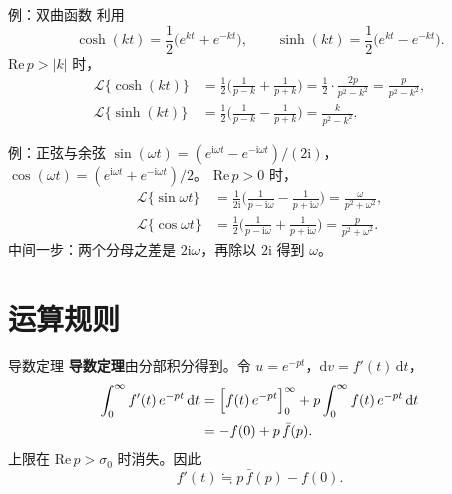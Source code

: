 \documentclass[fontset=windows, chinese, 10pt, xcolor=dvipsnames]{beamer}
\begin{document}
\begin{frame}{例：双曲函数}
  利用
  \begin{equation*}
    \cosh(kt)=\frac12\bigl(e^{kt}+e^{-kt}\bigr),
    \qquad
    \sinh(kt)=\frac12\bigl(e^{kt}-e^{-kt}\bigr).
  \end{equation*}
  $\mathrm{Re}\,p>|k|$ 时，
  \begin{align*}
    \mathcal{L}\{\cosh(kt)\}
    &=\frac12\Biggl(\frac{1}{p-k}+\frac{1}{p+k}\Biggr)
     =\frac12\cdot\frac{2p}{p^2-k^2}
     =\frac{p}{p^2-k^2},\\[0.4em]
    \mathcal{L}\{\sinh(kt)\}
    &=\frac12\Biggl(\frac{1}{p-k}-\frac{1}{p+k}\Biggr)
     =\frac{k}{p^2-k^2}.
  \end{align*}
\end{frame}

\begin{frame}{例：正弦与余弦}
  $\sin(\omega t)=(e^{\mathrm{i}\omega t}-e^{-\mathrm{i}\omega t})/(2\mathrm{i})$，
  $\cos(\omega t)=(e^{\mathrm{i}\omega t}+e^{-\mathrm{i}\omega t})/2$。
  $\mathrm{Re}\,p>0$ 时，
  \begin{align*}
    \mathcal{L}\{\sin\omega t\}
    &=\frac{1}{2\mathrm{i}}
      \Biggl(\frac{1}{p-\mathrm{i}\omega}-\frac{1}{p+\mathrm{i}\omega}\Biggr)
     =\frac{\omega}{p^2+\omega^2},\\[0.4em]
    \mathcal{L}\{\cos\omega t\}
    &=\frac12
      \Biggl(\frac{1}{p-\mathrm{i}\omega}+\frac{1}{p+\mathrm{i}\omega}\Biggr)
     =\frac{p}{p^2+\omega^2}.
  \end{align*}
  中间一步：两个分母之差是 $2\mathrm{i}\omega$，再除以 $2\mathrm{i}$ 得到 $\omega$。
\end{frame}

\section{运算规则}

\begin{frame}{导数定理}
  \textbf{导数定理}由分部积分得到。令 $u=e^{-pt}$，$\mathrm{d}v=f'(t)\,\mathrm{d}t$，
  \begin{align*}
    \int_0^{\infty} f'(t)\,e^{-pt}\,\mathrm{d}t
    &=\Bigl[f(t)\,e^{-pt}\Bigr]_0^{\infty}
      +p\int_0^{\infty} f(t)\,e^{-pt}\,\mathrm{d}t \\
    &=-f(0)+p\,\bar f(p).
  \end{align*}
  上限在 $\mathrm{Re}\,p>\sigma_0$ 时消失。因此
  \begin{equation*}
    f'(t)\fallingdotseq p\,\bar f(p)-f(0).
  \end{equation*}
\end{frame}
\end{document}
